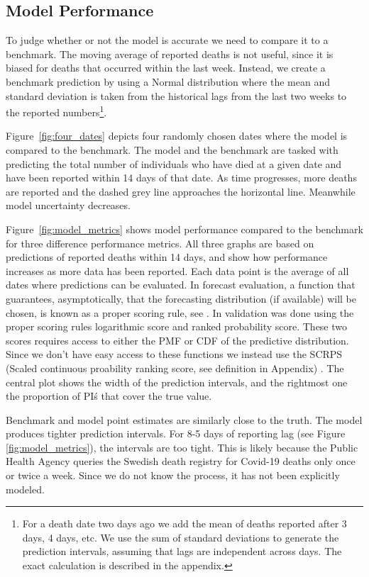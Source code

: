 \documentclass[a4paper,11pth]{article}
\begin{document}
\subsection{Model Performance}
To judge whether or not the model is accurate we need to compare it to a benchmark. The moving average of reported deaths is not useful, since it is biased for deaths that occurred within the last week. Instead, we create a benchmark prediction by using a Normal distribution where the mean and standard deviation is taken from the historical lags from the last two weeks to the reported numbers\footnote{For a death date two days ago we add the mean of deaths reported after 3 days, 4 days, etc. We use the sum of standard deviations to generate the prediction intervals, assuming that lags are independent across days. The exact calculation is described in the appendix.}. 

Figure~\ref{fig:four_dates} depicts four randomly chosen dates where the model is compared to the benchmark. The model and the benchmark are tasked with predicting the total number of individuals who have died at a given date and have been reported within 14 days of that date. As time progresses, more deaths are reported and the dashed grey line approaches the horizontal line. Meanwhile model uncertainty decreases.

Figure~\ref{fig:model_metrics} shows model performance compared to the benchmark for three difference performance metrics. All three graphs are based on predictions of reported deaths within 14 days, and show how performance increases as more data has been reported. Each data point is the average of all dates where predictions can be evaluated.
In forecast evaluation, a function that guarantees, asymptotically, that the forecasting distribution (if available) will be chosen, is known as a proper scoring rule, see \cite{gneiting2007strictly}.
In \cite{hohle2014bayesian} validation was done using the proper scoring rules logarithmic score and ranked probability score. These two scores requires access to either the PMF or CDF of the predictive distribution. Since we don't have easy access to these functions we instead use the  SCRPS (Scaled continuous proability ranking score, see definition in Appendix) \citep{bolin2019scale}. The central plot shows the width of the prediction intervals, and the rightmost one the proportion of PI\'s that cover the true value.

Benchmark and model point estimates are similarly close to the truth. The model produces tighter prediction intervals. For 8-5 days of reporting lag (see Figure \ref{fig:model_metrics}), the intervals are too tight. This is likely because the Public Health Agency queries the Swedish death registry for Covid-19 deaths only once or twice a week. Since we do not know the process, it has not been explicitly modeled.
\end{document}
